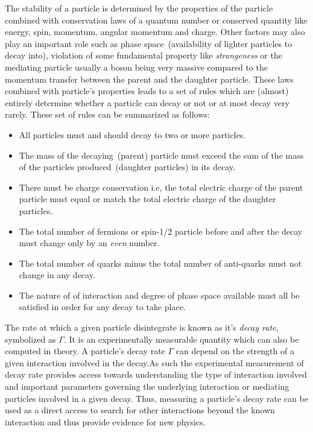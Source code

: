 The stability of a particle is determined by the properties of the particle combined with  conservation laws of a quantum number or conserved quantity like energy, spin, momentum, angular momentum and charge. Other factors may also play an important role such as phase space~(availability of lighter particles to decay into), violation of some fundamental property like \textit{strangeness} or the mediating particle usually a boson being very massive compared to the momentum transfer between the parent and the daughter particle. These laws combined with particle's properties leads to a set of rules which are (almost) entirely determine whether a particle can decay or not or at most decay very rarely.  
These set of rules can be summarized as follows:
\begin{itemize}
\item All particles must and should decay to two or more particles.
\item The mass of the decaying~(parent) particle must exceed the sum of the mass  of the particles produced~(daughter particles) in its decay.
\item There must be charge conservation i.e, the total electric charge of the parent particle must equal or match the total electric charge of the daughter particles.
\item The total number of fermions or spin-1/2 particle before and after the decay must change only by an \textit{even} number.
\item The total number of quarks minus the total number of anti-quarks must not change in any decay.
\item The nature of of interaction and degree of phase space available must all be satisfied in order for any decay to take place.
\end{itemize}

The rate at which a given particle disintegrate  is known as it's \textit{decay rate}, symbolized as \textbf{$\Gamma$}. It is an experimentally measurable quantity which can also be computed in theory. A particle's decay rate $\Gamma$ can depend on the strength of a given interaction involved in the decay.As such the experimental measurement of decay rate provides access towards understanding the type of interaction involved and important parameters governing the underlying interaction or mediating particles involved in a given decay. Thus, measuring a particle's decay rate can be used as a direct access to search for other interactions beyond the known interaction and thus provide evidence for new physics. 

